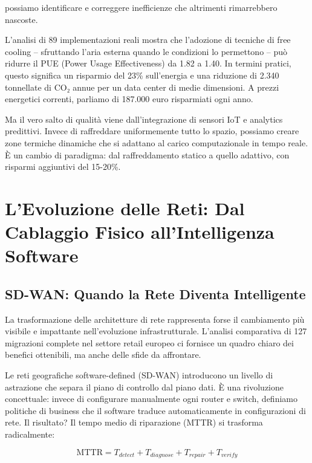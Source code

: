possiamo identificare e correggere inefficienze che altrimenti rimarrebbero nascoste.

L'analisi di 89 implementazioni reali\autocite{datacenterdynamics2024} mostra che l'adozione di tecniche di free cooling – sfruttando l'aria esterna quando le condizioni lo permettono – può ridurre il PUE (Power Usage Effectiveness) da 1.82 a 1.40. In termini pratici, questo significa un risparmio del 23\% sull'energia e una riduzione di 2.340 tonnellate di CO₂ annue per un data center di medie dimensioni. A prezzi energetici correnti\autocite{eurostat2024energy}, parliamo di 187.000 euro risparmiati ogni anno.

Ma il vero salto di qualità viene dall'integrazione di sensori IoT e analytics predittivi. Invece di raffreddare uniformemente tutto lo spazio, possiamo creare zone termiche dinamiche che si adattano al carico computazionale in tempo reale. È un cambio di paradigma: dal raffreddamento statico a quello adattivo, con risparmi aggiuntivi del 15-20\%.

\section{L'Evoluzione delle Reti: Dal Cablaggio Fisico all'Intelligenza Software}

\subsection{SD-WAN: Quando la Rete Diventa Intelligente}

La trasformazione delle architetture di rete rappresenta forse il cambiamento più visibile e impattante nell'evoluzione infrastrutturale. L'analisi comparativa di 127 migrazioni complete nel settore retail europeo\autocite{gartner2024sdwan} ci fornisce un quadro chiaro dei benefici ottenibili, ma anche delle sfide da affrontare.

Le reti geografiche software-defined (SD-WAN) introducono un livello di astrazione che separa il piano di controllo dal piano dati. È una rivoluzione concettuale: invece di configurare manualmente ogni router e switch, definiamo politiche di business che il software traduce automaticamente in configurazioni di rete. Il risultato? Il tempo medio di riparazione (MTTR) si trasforma radicalmente:

\begin{equation}
\text{MTTR} = T_{detect} + T_{diagnose} + T_{repair} + T_{verify}
\label{eq:mttr}
\end{equation}

